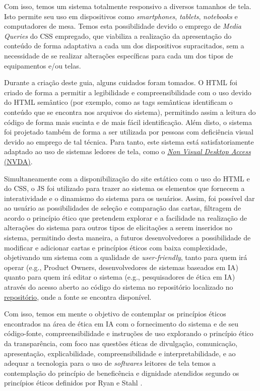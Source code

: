Com isso, temos um sistema totalmente responsivo a diversos tamanhos de tela. Isto permite seu uso em dispositivos como \textit{smartphones}, \textit{tablets}, \textit{notebooks} e computadores de mesa. Temos esta possibilidade devido o emprego de \textit{Media Queries} do CSS empregado, que viabiliza a realização da apresentação do conteúdo de forma adaptativa a cada um dos dispositivos supracitados, sem a necessidade de se realizar alterações específicas para cada um dos tipos de equipamentos e/ou telas.

Durante a criação deste guia, alguns cuidados foram tomados. O \acrshort{HTML} foi criado de forma a permitir a legibilidade e compreensibilidade com o uso devido do \acrshort{HTML} semântico (por exemplo, como as tags semânticas identificam o conteúdo que se encontra nos arquivos do sistema), permitindo assim a leitura do código de forma mais sucinta e de mais fácil identificação. Além disto, o sistema foi projetado também de forma a ser utilizada por pessoas com deficiência visual devido ao emprego de tal técnica. Para tanto, este sistema está satisfatoriamente adaptado ao uso de sistemas ledores de tela, como o \href{https://www.nvaccess.org/}{\textit{Non Visual Desktop Access} (NVDA)}.

Simultaneamente com a disponibilização do site estático com o uso do \acrshort{HTML} e do \acrshort{CSS}, o \acrshort{JS} foi utilizado para trazer ao sistema os elementos que fornecem a interatividade e o dinamismo do sistema para os usuários. Assim, foi possível dar ao usuário as possibilidades de seleção e comparação das cartas, filtragem de acordo o princípio ético que pretendem explorar e a facilidade na realização de alterações do sistema para outros tipos de elicitações a serem inseridos no sistema, permitindo desta maneira, a futuros desenvolvedores a possibilidade de modificar e adicionar cartas e princípios éticos com baixa complexidade, objetivando um sistema com a qualidade de \textit{user-friendly}, tanto para quem irá operar (e.g., Product Owners, desenvolvedores de sistemas baseados em IA) quanto para quem irá editar o sistema (e.g., pesquisadores de ética em IA) através do acesso aberto ao código do sistema no repositório localizado no  \href{https://www.GitHub.com/oggvaldo/eccola}{repositório}, onde a fonte se encontra disponível.

Com isso, temos em mente o objetivo de contemplar os princípios éticos encontrados na área de ética em IA com o fornecimento do sistema e de seu código-fonte, compreensibilidade e instruções de uso explorando o princípio ético da transparência, com foco nas questões éticas de divulgação, comunicação, apresentação, explicabilidade, compreensibilidade e interpretabilidade, e ao adequar a tecnologia para o uso de \textit{softwares} leitores de tela temos a contemplação do princípio de beneficência e dignidade atendidos segundo os princípios éticos definidos por Ryan e Stahl \cite{Ryan2020ArtificialIE}.

